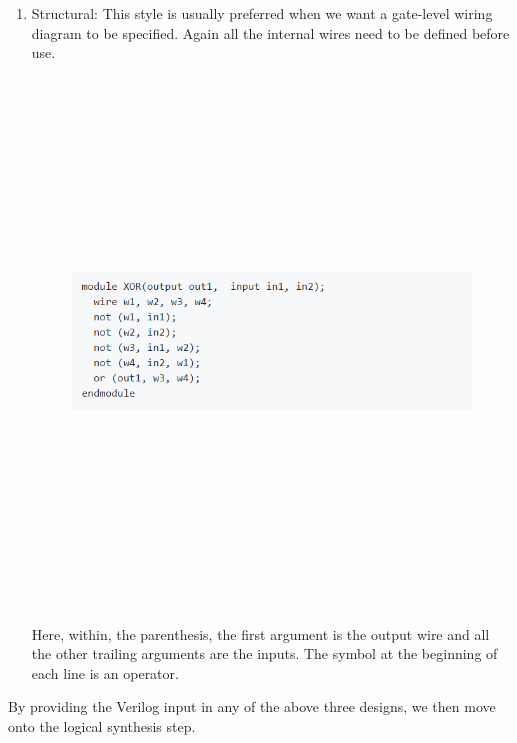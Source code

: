\documentclass[11pt]{article}
\begin{document}
\begin{enumerate}
\item Structural: 
This style is usually preferred when we want a gate-level wiring diagram to be specified. Again all the internal wires need to be defined before use.  
\begin{figure}[ht!]
\centering
\includegraphics[width=11cm,height=14cm,keepaspectratio]{structural.png}
\label{Structural statements exmaple}
\end{figure}

Here, within, the parenthesis, the first argument is the output wire and all the other trailing arguments are the inputs. The symbol at the beginning of each line is an operator.\\[\baselineskip]     
\bigskip
\bigskip
\bigskip
\bigskip
\end{enumerate}
By providing the Verilog input in any of the above three designs, we then move onto the logical synthesis step.
\end{document}
